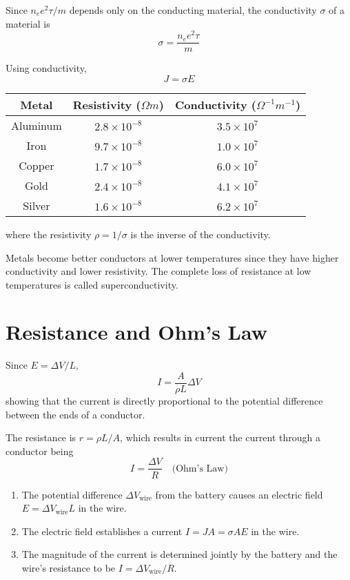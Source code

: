 \documentclass{article}
\begin{document}
Since $n_e e^2 \tau / m$ depends only on the conducting material, the conductivity $\sigma$ of a
material is
\[\sigma = \frac{n_e e^2 \tau}{m}\]

Using conductivity,\
\[J=\sigma E\]

\begin{center}
\begin{tabular}{|c c c|} 
    \hline
    Metal & Resistivity ($\Omega m$) & Conductivity ($\Omega^{-1} m^{-1}$) \\ [0.5ex]
    \hline
    Aluminum & $2.8\times 10^{-8}$ & $3.5\times 10^7$ \\
    \hline
    Iron & $9.7\times 10^{-8}$ & $1.0\times 10^7$ \\
    \hline
    Copper & $1.7 \times 10^{-8}$ & $6.0\times 10^7$ \\
    \hline
    Gold & $2.4\times 10^{-8}$ & $4.1\times 10^7$ \\
    \hline
    Silver & $1.6\times 10^{-8}$ & $6.2\times 10^7$ \\
    \hline
\end{tabular}
\end{center}
where the resistivity $\rho = 1/\sigma$ is the inverse of the conductivity.

\vspace{1em}

Metals become better conductors at lower temperatures since they have higher conductivity and lower
resistivity. The complete loss of resistance at low temperatures is called superconductivity.

\section*{Resistance and Ohm's Law}
Since $E=\Delta V / L$,
\[I=\frac{A}{\rho L}\Delta V\] showing that the current is directly proportional to the potential
difference between the ends of a conductor.

\vspace{1em}

The resistance is $r=\rho L / A$, which results in current the current through a conductor being
\[I=\frac{\Delta V}{R}\quad\text{(Ohm's Law)}\]

\begin{enumerate}
    \item The potential difference $\Delta V_\text{wire}$ from the battery causes an electric field
    $E=\Delta V_\text{wire} L$ in the wire.
    \item The electric field establishes a current $I=JA=\sigma AE$ in the wire.
    \item The magnitude of the current is determined jointly by the battery and the wire's
    resistance to be $I=\Delta V_\text{wire}/R$.
\end{enumerate}
\end{document}
